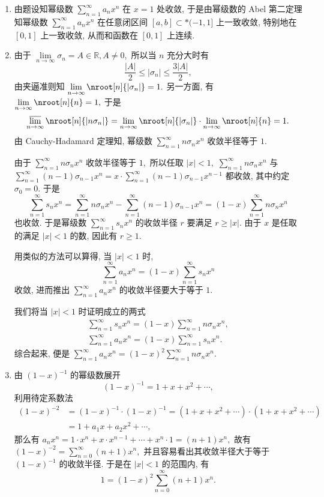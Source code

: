 \begin{solution}
\begin{enumerate}
\item 由题设知幂级数 $\sum\limits_{n=1}^{\infty} a_nx^n$ 在 $x = 1$ 处收敛, 于是由幂级数的 Abel 第二定理知幂级数 $\sum\limits_{n=1}^{\infty} a_nx^n$ 在任意闭区间 $[a, b] \subset* (-1, 1]$ 上一致收敛, 特别地在 $[0, 1]$ 上一致收敛, 从而和函数在 $[0, 1]$ 上连续.
\item 由于 $\lim\limits_{n\to\infty} \sigma_n = A \in \mathbb{R}, A \neq 0,$ 所以当 $n$ 充分大时有
$$\dfrac{\lvert A \rvert}{2} \leqslant \lvert \sigma_n \rvert \leqslant \dfrac{3\lvert A \rvert}{2},$$
由夹逼准则知 $\lim\limits_{n\to\infty} \nroot[n]{\lvert \sigma_n \rvert} = 1.$ 另一方面, 有 $\lim\limits_{n\to\infty} \nroot[n]{n} = 1,$ 于是
$$\varlimsup_{n\to\infty} \nroot[n]{\lvert n\sigma_n \rvert} = \lim\limits_{n\to\infty} \nroot[n]{\lvert \sigma_n \rvert} \cdot \lim\limits_{n\to\infty} \nroot[n]{n} = 1.$$
由 Cauchy-Hadamard 定理知, 幂级数 $\sum\limits_{n=1}^{\infty} n\sigma_n x^n$ 收敛半径等于 $1.$

由于 $\sum\limits_{n=1}^{\infty} n\sigma_n x^n$ 收敛半径等于 $1,$ 所以任取 $\lvert x \rvert < 1,$ $\sum\limits_{n=1}^{\infty} n\sigma_n x^n$ 与 $\sum\limits_{n=1}^{\infty} (n-1) \sigma_{n-1} x^n = x \cdot \sum\limits_{n=1}^{\infty} (n-1) \sigma_{n-1} x^{n-1}$ 都收敛, 其中约定 $\sigma_0 = 0.$ 于是
$$\sum\limits_{n=1}^{\infty} s_n x^n = \sum\limits_{n=1}^{\infty} n\sigma_n x^n - \sum\limits_{n=1}^{\infty} (n-1) \sigma_{n-1} x^n = (1-x) \sum\limits_{n=1}^{\infty} n\sigma_n x^n$$
也收敛. 于是幂级数 $\sum\limits_{n=1}^{\infty} s_n x^n$ 的收敛半径 $r$ 要满足 $r \geqslant \lvert x \rvert.$ 由于 $x$ 是任取的满足 $\lvert x \rvert < 1$ 的数, 因此有 $r \geqslant 1.$

用类似的方法可以算得, 当 $\lvert x \rvert < 1$ 时,
$$\sum\limits_{n=1}^{\infty} a_n x^n = (1 - x) \sum\limits_{n=1}^{\infty} s_n x^n$$
收敛, 进而推出 $\sum\limits_{n=1}^{\infty} a_n x^n$ 的收敛半径要大于等于 $1.$

我们将当 $\lvert x \rvert < 1$ 时证明成立的两式
\begin{gather*}
\sum\limits_{n=1}^{\infty} s_n x^n = (1-x) \sum\limits_{n=1}^{\infty} n\sigma_n x^n, \\
\sum\limits_{n=1}^{\infty} a_n x^n = (1 - x) \sum\limits_{n=1}^{\infty} s_n x^n.
\end{gather*}
综合起来, 便是 $\sum\limits_{n=1}^{\infty} a_n x^n = (1-x)^2 \sum\limits_{n=1}^{\infty} n\sigma_n x^n.$
\item 由 $(1-x)^{-1}$ 的幂级数展开
$$(1-x)^{-1} = 1 + x + x^2 + \cdots,$$
利用待定系数法
\begin{align*}
(1-x)^{-2} & = (1-x)^{-1} \cdot (1-x)^{-1} = (1 + x + x^2 + \cdots) \cdot (1 + x + x^2 + \cdots) \\
& = 1 + a_1x + a_2x^2 + \cdots,
\end{align*}
那么有 $a_nx^n = 1\cdot x^n + x\cdot x^{n-1} + \cdots + x^n\cdot 1 = (n+1) x^n,$
故有 $(1-x)^{-2} = \sum\limits_{n=0}^\infty (n+1) x^n,$ 并且容易看出其收敛半径大于等于 $(1-x)^{-1}$ 的收敛半径. 于是在 $\lvert x \rvert < 1$ 的范围内, 有
$$1 = (1-x)^2 \sum\limits_{n=0}^\infty (n+1) x^n.$$


\end{enumerate}
\end{solution}
